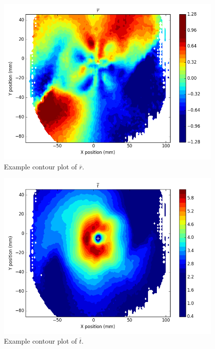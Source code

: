 {\begin{figure}[H]
	\centering
	\includegraphics[width=5in]{figs/example_vortex_figs/example_R_contour}
\caption{Example contour plot of $\overline{r}$.}
\label{fig:examp_R}
\end{figure}

\begin{figure}[H]
	\centering
	\includegraphics[width=5in]{figs/example_vortex_figs/example_T_contour}
\caption{Example contour plot of $\overline{t}$.}
\label{fig:examp_T}
\end{figure}

}
